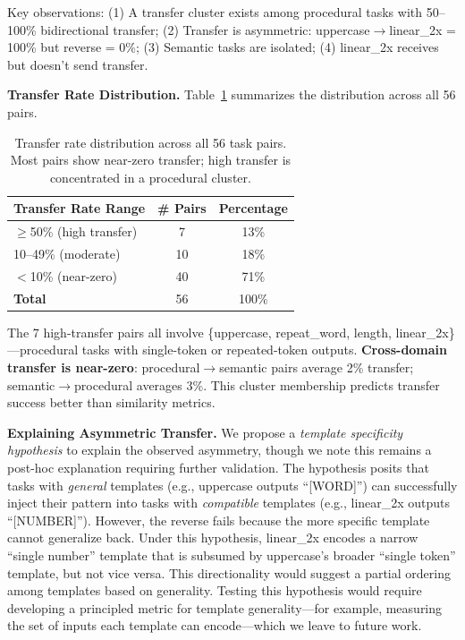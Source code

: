\documentclass[sigconf,anonymous]{acmart}
\begin{document}
Key observations: (1) A transfer cluster exists among procedural tasks with 50--100\% bidirectional transfer; (2) Transfer is asymmetric: uppercase$\to$linear\_2x = 100\% but reverse = 0\%; (3) Semantic tasks are isolated; (4) linear\_2x receives but doesn't send transfer.

\textbf{Transfer Rate Distribution.} Table~\ref{tab:transfer_dist} summarizes the distribution across all 56 pairs.

\begin{table}[h]
\centering
\small
\caption{Transfer rate distribution across all 56 task pairs. Most pairs show near-zero transfer; high transfer is concentrated in a procedural cluster.}
\label{tab:transfer_dist}
\begin{tabular}{@{}lcc@{}}
\toprule
Transfer Rate Range & \# Pairs & Percentage \\
\midrule
$\geq$50\% (high transfer) & 7 & 13\% \\
10--49\% (moderate) & 10 & 18\% \\
$<$10\% (near-zero) & 40 & 71\% \\
\midrule
\textbf{Total} & 56 & 100\% \\
\bottomrule
\end{tabular}
\end{table}

The 7 high-transfer pairs all involve \{uppercase, repeat\_word, length, linear\_2x\}---procedural tasks with single-token or repeated-token outputs. \textbf{Cross-domain transfer is near-zero}: procedural$\to$semantic pairs average 2\% transfer; semantic$\to$procedural averages 3\%. This cluster membership predicts transfer success better than similarity metrics.

\textbf{Explaining Asymmetric Transfer.} We propose a \emph{template specificity hypothesis} to explain the observed asymmetry, though we note this remains a post-hoc explanation requiring further validation. The hypothesis posits that tasks with \emph{general} templates (e.g., uppercase outputs ``[WORD]'') can successfully inject their pattern into tasks with \emph{compatible} templates (e.g., linear\_2x outputs ``[NUMBER]''). However, the reverse fails because the more specific template cannot generalize back. Under this hypothesis, linear\_2x encodes a narrow ``single number'' template that is subsumed by uppercase's broader ``single token'' template, but not vice versa. This directionality would suggest a partial ordering among templates based on generality. Testing this hypothesis would require developing a principled metric for template generality---for example, measuring the set of inputs each template can encode---which we leave to future work.
\end{document}
